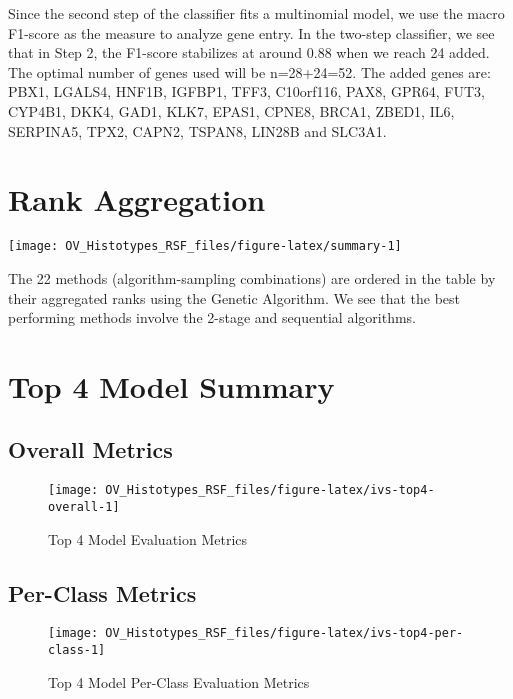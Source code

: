 \documentclass[
]{report}
\begin{document}
Since the second step of the classifier fits a multinomial model, we use the macro F1-score as the measure to analyze gene entry. In the two-step classifier, we see that in Step 2, the F1-score stabilizes at around 0.88 when we reach 24 added. The optimal number of genes used will be n=28+24=52. The added genes are: PBX1, LGALS4, HNF1B, IGFBP1, TFF3, C10orf116, PAX8, GPR64, FUT3, CYP4B1, DKK4, GAD1, KLK7, EPAS1, CPNE8, BRCA1, ZBED1, IL6, SERPINA5, TPX2, CAPN2, TSPAN8, LIN28B and SLC3A1.

\hypertarget{rank-aggregation}{%
\section{Rank Aggregation}\label{rank-aggregation}}

\begin{center}\texttt{[image: OV\_Histotypes\_RSF\_files/figure-latex/summary-1]} \end{center}

The 22 methods (algorithm-sampling combinations) are ordered in the table by their aggregated ranks using the Genetic Algorithm. We see that the best performing methods involve the 2-stage and sequential algorithms.

\hypertarget{top-4-model-summary}{%
\section{Top 4 Model Summary}\label{top-4-model-summary}}

\hypertarget{overall-metrics}{%
\subsection{Overall Metrics}\label{overall-metrics}}

\begin{figure}[H]

{\centering \texttt{[image: OV\_Histotypes\_RSF\_files/figure-latex/ivs-top4-overall-1]} 

}

\caption{Top 4 Model Evaluation Metrics}\label{fig:ivs-top4-overall}
\end{figure}

\hypertarget{per-class-metrics}{%
\subsection{Per-Class Metrics}\label{per-class-metrics}}

\begin{figure}[H]

{\centering \texttt{[image: OV\_Histotypes\_RSF\_files/figure-latex/ivs-top4-per-class-1]} 

}

\caption{Top 4 Model Per-Class Evaluation Metrics}\label{fig:ivs-top4-per-class}
\end{figure}
\end{document}
